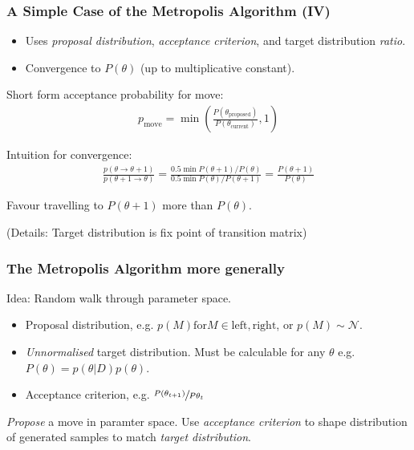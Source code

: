 \documentclass[usenames,dvipsnames,table]{beamer}
\begin{document}
\begin{frame}
\frametitle{A Simple Case of the Metropolis Algorithm (IV)}
\begin{itemize}
\item Uses \emph{proposal distribution}, \emph{acceptance criterion}, and target distribution \emph{ratio}.
\item Convergence to $P(\theta)$ (up to multiplicative constant). 
\end{itemize}

Short form acceptance probability for move:
\begin{align*}
p_{\mathrm{move}} = \min \left(\frac{P(\theta_{\mathrm{proposed}})}{P(\theta_{\mathrm{current}})}, 1\right)
\tag{7.1}
\end{align*}

Intuition for convergence:
\begin{align*}
\frac{p(\theta \to \theta + 1)}{p(\theta + 1 \to \theta)}
    = \frac{0.5 \min{P(\theta+1)/P(\theta)}}
           {0.5 \min{P(\theta)/P(\theta+1)}}
    = \frac{P(\theta + 1)}{P(\theta)}
\tag{7.2}
\end{align*}

Favour travelling to $P(\theta+1)$ more than $P(\theta)$.

(Details: Target distribution is fix point of transition matrix)

\end{frame}

\begin{frame}
\frametitle{The Metropolis Algorithm more generally}
Idea: Random walk through parameter space.
\begin{itemize}
\item Proposal distribution, e.g. $p(M) \mathrm{for} M \in {\mathrm{left}, \mathrm{right}}$, or $p(M) \sim \mathcal{N}$.
\item \emph{Unnormalised} target distribution. Must be calculable for any $\theta$ e.g. $P(\theta) = p(\theta|D)p(\theta)$.
\item Acceptance criterion, e.g. $\sfrac{P(\theta_{t+1})}{P{\theta_{t}}}$
\end{itemize}

\emph{Propose} a move in paramter space. Use \emph{acceptance criterion} to shape distribution of generated samples to match \emph{target distribution}.
\end{frame}
\end{document}
